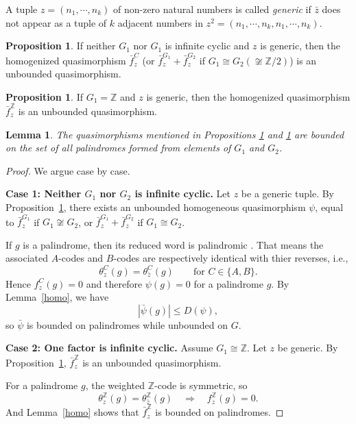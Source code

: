 \documentclass[12pt]{amsart}
\newtheorem{lemma}[theorem]{Lemma}
\theoremstyle{definition}
\newtheorem{prop}[theorem]{Proposition}
\theoremstyle{remark}
\numberwithin{equation}{subsection}
\theoremstyle{plain}
\numberwithin{equation}{section}
\begin{document}
A tuple $z = (n_1, \cdots , n_k)$ of non-zero natural numbers  is called \emph{generic} if $\bar{z}$ does not appear as a tuple of $k$ adjacent numbers in $z^2 = (n_1,\cdots , n_k, n_1, \cdots, n_k)$.  

\begin{prop}\cite[Proposition 4.11]{KB}\label{noncyclic}
If neither $ G_1 $ nor $ G_1 $ is infinite cyclic and $ z $ is generic, then the homogenized quasimorphism $ \bar{f}_z^C $ (or $ \bar{f}_z^{G_1} + \bar{f}_z^{G_2} $ if $ G_1 \cong G_2 (\not\cong \mathbb{Z}/2)$) is an unbounded quasimorphism.
\end{prop}

\begin{prop}\cite[Proposition 5.7]{KB}\label{cyclic}
If $ G_1 = \mathbb{Z} $ and $ z $ is generic, then the homogenized quasimorphism $ \bar{f}_z^{\mathbb{Z}} $ is an unbounded quasimorphism.
\end{prop}



\begin{lemma}\label{freeprodpali}
   The quasimorphisms mentioned in Propositions \ref{noncyclic} and \ref{cyclic} are bounded on the set of all palindromes formed from elements of $G_1$ and $G_2$.
\end{lemma}

\begin{proof}
  We argue case by case.

  \smallskip
\textbf{Case 1: Neither $G_1$ nor $G_2$ is infinite cyclic.}  
Let $z$ be a generic tuple.  
By Proposition~\ref{noncyclic}, there exists an unbounded homogeneous quasimorphism
$\psi$, equal to $\bar{f}_z^{G_1}$ if $G_1 \not\cong G_2$, or  
$\bar{f}_z^{G_1} + \bar{f}_z^{G_2}$ if $G_1 \cong G_2$.

If $g$ is a palindrome, then its reduced word is palindromic \cite{GK}.  
That means the associated $A$-codes and $B$-codes are respectively identical with thier reverses, i.e.,
\[
\theta_z^C(g) = \theta_{\bar z}^C(g) \qquad \text{for } C \in \{A,B\}.
\]
Hence  $f_z^C(g)=0$ and therefore $\psi(g)=0$ for a palindrome $g$.  
By Lemma~\ref{homo}, we have
\[
|\bar{\psi}(g)| \le D(\psi),
\]
so $\bar{\psi}$ is bounded on palindromes while unbounded on $G$.

\smallskip
\textbf{Case 2: One factor is infinite cyclic.}  
Assume $G_1 \cong \mathbb{Z}$.  
Let $z$ be generic.  
By Proposition~\ref{cyclic}, $\bar{f}_z^{\mathbb{Z}}$ is an unbounded quasimorphism.

For a palindrome $g$, the weighted $\mathbb{Z}$-code is symmetric, so
\[
\theta_z^{\mathbb{Z}}(g)=\theta_{\bar z}^{\mathbb{Z}}(g)
\quad\Rightarrow\quad
f_z^{\mathbb{Z}}(g)=0.
\]
And Lemma~\ref{homo} shows that $\bar{f}_z^{\mathbb{Z}}$ is bounded on palindromes.
\end{proof}
\end{document}
